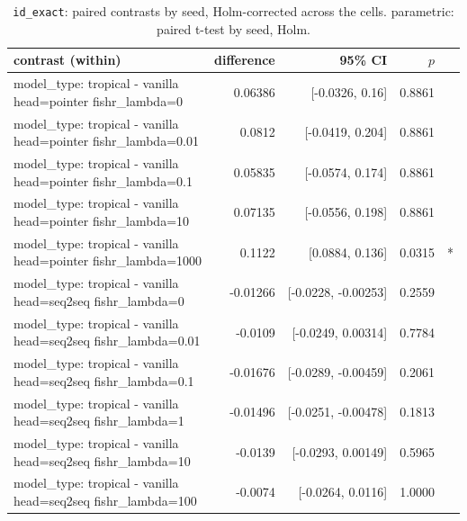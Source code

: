 \documentclass[10pt]{article}
\makeatletter
\newcommand{\stackcell}[1]{\begin{tabular}[t]{@{}l@{}}#1\end{tabular}}
\makeatother
\begin{document}
{\small
\begin{longtable}{lrrrl}
\caption{\texttt{id\_exact}: paired contrasts by seed, Holm-corrected across the cells. parametric: paired t-test by seed, Holm.}\label{tab:paired-id_exact}\\
\toprule
contrast (within) & difference & 95\% CI & $p$ & \\
\midrule
\endhead
\stackcell{model\_type: tropical - vanilla\\\footnotesize head=pointer fishr\_lambda=0 } & 0.06386 & [-0.0326, 0.16] & 0.8861 & \\
\stackcell{model\_type: tropical - vanilla\\\footnotesize head=pointer fishr\_lambda=0.01 } & 0.0812 & [-0.0419, 0.204] & 0.8861 & \\
\stackcell{model\_type: tropical - vanilla\\\footnotesize head=pointer fishr\_lambda=0.1 } & 0.05835 & [-0.0574, 0.174] & 0.8861 & \\
\stackcell{model\_type: tropical - vanilla\\\footnotesize head=pointer fishr\_lambda=10 } & 0.07135 & [-0.0556, 0.198] & 0.8861 & \\
\stackcell{model\_type: tropical - vanilla\\\footnotesize head=pointer fishr\_lambda=1000 } & 0.1122 & [0.0884, 0.136] & 0.0315 & *\\
\stackcell{model\_type: tropical - vanilla\\\footnotesize head=seq2seq fishr\_lambda=0 } & -0.01266 & [-0.0228, -0.00253] & 0.2559 & \\
\stackcell{model\_type: tropical - vanilla\\\footnotesize head=seq2seq fishr\_lambda=0.01 } & -0.0109 & [-0.0249, 0.00314] & 0.7784 & \\
\stackcell{model\_type: tropical - vanilla\\\footnotesize head=seq2seq fishr\_lambda=0.1 } & -0.01676 & [-0.0289, -0.00459] & 0.2061 & \\
\stackcell{model\_type: tropical - vanilla\\\footnotesize head=seq2seq fishr\_lambda=1 } & -0.01496 & [-0.0251, -0.00478] & 0.1813 & \\
\stackcell{model\_type: tropical - vanilla\\\footnotesize head=seq2seq fishr\_lambda=10 } & -0.0139 & [-0.0293, 0.00149] & 0.5965 & \\
\stackcell{model\_type: tropical - vanilla\\\footnotesize head=seq2seq fishr\_lambda=100 } & -0.0074 & [-0.0264, 0.0116] & 1.0000 & \\

\end{longtable}}
\end{document}
